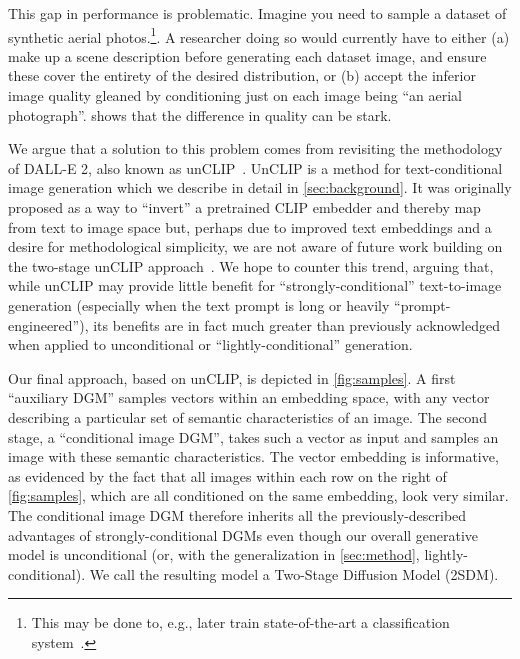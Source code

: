 


This gap in performance is problematic. Imagine you need to sample a dataset of synthetic aerial photos.\footnote{ This may be done to, e.g., later train state-of-the-art a classification system~\citep{azizi2023synthetic}.}. A researcher doing so would currently have to either (a) make up a scene description before generating each dataset image, and ensure these cover the entirety of the desired distribution, or (b) accept the inferior image quality gleaned by conditioning just on each image being ``an aerial photograph''.   shows that the difference in quality can be stark.

We argue that a solution to this problem comes from revisiting the methodology of DALL-E 2, also known as unCLIP~\citep{ramesh2022hierarchical}. UnCLIP is a method for text-conditional image generation which we describe in detail in \cref{sec:background}. It was originally proposed as a way to ``invert'' a pretrained CLIP embedder and thereby map from text to image space but, perhaps due to improved text embeddings and a desire for methodological simplicity, we are not aware of future work building on the two-stage unCLIP approach~\citep{rombach2022high,chang2023muse,hoogeboom2023simple}. We hope to counter this trend, arguing that, while unCLIP may provide little benefit for ``strongly-conditional'' text-to-image generation (especially when the text prompt is long or heavily ``prompt-engineered''), its benefits are in fact much greater than previously acknowledged when applied to unconditional or ``lightly-conditional'' generation.

Our final approach, based on unCLIP, is depicted in \cref{fig:samples}. A first ``auxiliary DGM'' samples vectors within an embedding space, with any vector describing a particular set of semantic characteristics of an image. The second stage, a ``conditional image DGM'', takes such a vector as input and samples an image with these semantic characteristics. The vector embedding is informative, as evidenced by the fact that all images within each row on the right of \cref{fig:samples}, which are all conditioned on the same embedding, look very similar. The conditional image DGM therefore inherits all the previously-described advantages of strongly-conditional DGMs even though our overall generative model is unconditional (or, with the generalization in \cref{sec:method}, lightly-conditional). We call the resulting model a Two-Stage Diffusion Model (2SDM). 

